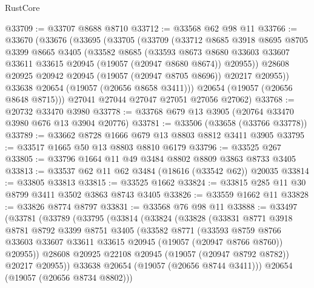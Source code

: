 \begin{lexlean}{RustCore}
\begin{coremodule}
@33709 := @33707 @8688 @8710
@33712 := @33568 @62 @98 @11
@33766 := @33670
    (@33676
      (@33695
        (@33705
          (@33709
            (@33712
              @8685
              @3918
              @8695
              @8705
              @3399
              @8665
              @3405
              (@33582
                @8685
                (@33593
                  @8673
                  @8680
                  @33603
                  @33607
                  @33611
                  @33615
                  @20945
                  (@19057 (@20947 @8680 @8674))
                  @20955))
              @28608
              @20925
              @20942
              @20945
              (@19057 (@20947 @8705 @8696))
              @20217
              @20955))
          @33638
          @20654
          (@19057 (@20656 @8658 @3411)))
        @20654
        (@19057 (@20656 @8648 @8715)))
      @27041
      @27044
      @27047
      @27051
      @27056
      @27062)
@33768 := @20732 @33470 @3980
@33778 := @33768 @679 @13 @3905 (@20764 @33470 @3980 @676 @13 @3904 @20776)
@33781 := @33506 (@33658 (@33766 @33778))
@33789 := @33662 @8728 @1666 @679 @13 @8803 @8812 @3411 @3905
@33795 := @33517 @1665 @50 @13 @8803 @8810 @6179
@33796 := @33525 @267
@33805 := @33796 @1664 @11 @49 @3484 @8802 @8809 @3863 @8733 @3405
@33813 := @33537 @62 @11 @62 @3484 (@18616 (@33542 @62)) @20035
@33814 := @33805 @33813
@33815 := @33525 @1662
@33824 := @33815 @285 @11 @30 @8799 @3411 @3502 @3863 @8743 @3405
@33826 := @33559 @1662 @11
@33828 := @33826 @8774 @8797
@33831 := @33568 @76 @98 @11
@33888 := @33497
    (@33781
      (@33789
        (@33795
          (@33814
            (@33824
              (@33828
                (@33831
                  @8771
                  @3918
                  @8781
                  @8792
                  @3399
                  @8751
                  @3405
                  (@33582
                    @8771
                    (@33593
                      @8759
                      @8766
                      @33603
                      @33607
                      @33611
                      @33615
                      @20945
                      (@19057 (@20947 @8766 @8760))
                      @20955))
                  @28608
                  @20925
                  @22108
                  @20945
                  (@19057 (@20947 @8792 @8782))
                  @20217
                  @20955))
              @33638
              @20654
              (@19057 (@20656 @8744 @3411)))
            @20654
            (@19057 (@20656 @8734 @8802)))

\end{coremodule}
\end{lexlean}
